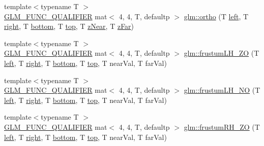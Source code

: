 \begin{DoxyCompactItemize}
{\footnotesize template$<$typename T $>$ }\\\hyperlink{setup_8hpp_a33fdea6f91c5f834105f7415e2a64407}{G\+L\+M\+\_\+\+F\+U\+N\+C\+\_\+\+Q\+U\+A\+L\+I\+F\+I\+ER} mat$<$ 4, 4, T, defaultp $>$ \hyperlink{group__gtc__matrix__transform_ga6615d8a9d39432e279c4575313ecb456}{glm\+::ortho} (T \hyperlink{_s_d_l__opengl__glext_8h_a85b8f6c07fbc1fb5d77c2ae090f21995}{left}, T \hyperlink{_s_d_l__opengl__glext_8h_a5ffadbbacc6b89cf6218bc43b384d3fe}{right}, T \hyperlink{_s_d_l__opengl__glext_8h_a95fc257e5ddf46f7db9d5e898cdf1991}{bottom}, T \hyperlink{_s_d_l__opengl__glext_8h_a5ab323daeacf8dfdb8f91132fecdca23}{top}, T \hyperlink{_s_d_l__opengl__glext_8h_a12d99226e590bbaaf0be69169eeb4834}{z\+Near}, T \hyperlink{_s_d_l__opengl__glext_8h_a1052a8235df129542aea6da80fbec6a1}{z\+Far})
\item 
{\footnotesize template$<$typename T $>$ }\\\hyperlink{setup_8hpp_a33fdea6f91c5f834105f7415e2a64407}{G\+L\+M\+\_\+\+F\+U\+N\+C\+\_\+\+Q\+U\+A\+L\+I\+F\+I\+ER} mat$<$ 4, 4, T, defaultp $>$ \hyperlink{group__gtc__matrix__transform_ga94218b094862d17798370242680b9030}{glm\+::frustum\+L\+H\+\_\+\+ZO} (T \hyperlink{_s_d_l__opengl__glext_8h_a85b8f6c07fbc1fb5d77c2ae090f21995}{left}, T \hyperlink{_s_d_l__opengl__glext_8h_a5ffadbbacc6b89cf6218bc43b384d3fe}{right}, T \hyperlink{_s_d_l__opengl__glext_8h_a95fc257e5ddf46f7db9d5e898cdf1991}{bottom}, T \hyperlink{_s_d_l__opengl__glext_8h_a5ab323daeacf8dfdb8f91132fecdca23}{top}, T near\+Val, T far\+Val)
\item 
{\footnotesize template$<$typename T $>$ }\\\hyperlink{setup_8hpp_a33fdea6f91c5f834105f7415e2a64407}{G\+L\+M\+\_\+\+F\+U\+N\+C\+\_\+\+Q\+U\+A\+L\+I\+F\+I\+ER} mat$<$ 4, 4, T, defaultp $>$ \hyperlink{group__gtc__matrix__transform_ga259520cad03b3f8bca9417920035ed01}{glm\+::frustum\+L\+H\+\_\+\+NO} (T \hyperlink{_s_d_l__opengl__glext_8h_a85b8f6c07fbc1fb5d77c2ae090f21995}{left}, T \hyperlink{_s_d_l__opengl__glext_8h_a5ffadbbacc6b89cf6218bc43b384d3fe}{right}, T \hyperlink{_s_d_l__opengl__glext_8h_a95fc257e5ddf46f7db9d5e898cdf1991}{bottom}, T \hyperlink{_s_d_l__opengl__glext_8h_a5ab323daeacf8dfdb8f91132fecdca23}{top}, T near\+Val, T far\+Val)
\item 
{\footnotesize template$<$typename T $>$ }\\\hyperlink{setup_8hpp_a33fdea6f91c5f834105f7415e2a64407}{G\+L\+M\+\_\+\+F\+U\+N\+C\+\_\+\+Q\+U\+A\+L\+I\+F\+I\+ER} mat$<$ 4, 4, T, defaultp $>$ \hyperlink{group__gtc__matrix__transform_ga7654a9227f14d5382786b9fc0eb5692d}{glm\+::frustum\+R\+H\+\_\+\+ZO} (T \hyperlink{_s_d_l__opengl__glext_8h_a85b8f6c07fbc1fb5d77c2ae090f21995}{left}, T \hyperlink{_s_d_l__opengl__glext_8h_a5ffadbbacc6b89cf6218bc43b384d3fe}{right}, T \hyperlink{_s_d_l__opengl__glext_8h_a95fc257e5ddf46f7db9d5e898cdf1991}{bottom}, T \hyperlink{_s_d_l__opengl__glext_8h_a5ab323daeacf8dfdb8f91132fecdca23}{top}, T near\+Val, T far\+Val)

\end{DoxyCompactItemize}
